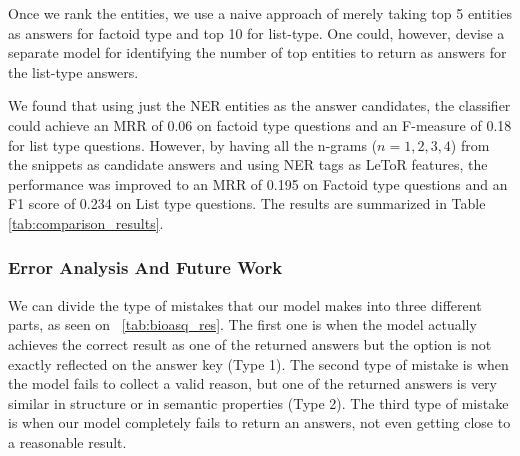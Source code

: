 

Once we rank the entities, we use a naive approach of merely taking top 5 entities as answers for factoid type and top 10 for list-type. One could, however, devise a separate model for identifying the number of top entities to return as answers for the list-type answers. 

We found that using just the NER entities as the answer candidates, the classifier could achieve an MRR of 0.06 on factoid type questions and an F-measure of 0.18 for list type questions. However, by having all the n-grams ($n = 1, 2, 3, 4$) from the snippets as candidate answers and using NER tags as LeToR features, the performance was improved to an MRR of 0.195 on Factoid type questions and an F1 score of 0.234  on List type questions. The results are summarized in Table \ref{tab:comparison_results}.


\subsubsection{Error Analysis And Future Work}

We can divide the type of mistakes that our model makes into three different parts, as seen on ~\ref{tab:bioasq_res}. The first one is when the model actually achieves the correct result as one of the returned answers but the option is not exactly reflected on the answer key (Type 1). The second type of mistake is when the model fails to collect a valid reason, but one of the returned answers is very similar in structure or in semantic properties (Type 2). The third type of mistake is when our model completely fails to return an answers, not even getting close to a reasonable result.

